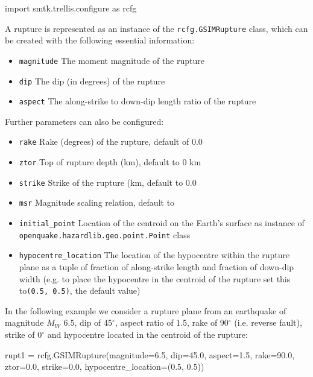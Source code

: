 \begin{python}
import smtk.trellis.configure as rcfg
\end{python}

A rupture is represented as an instance of the \verb=rcfg.GSIMRupture= class, which can be created with the following essential information:

\begin{itemize}
\item \verb=magnitude= The moment magnitude of the rupture
\item \verb=dip= The dip (in degrees) of the rupture
\item \verb=aspect= The along-strike to down-dip length ratio of the rupture
\end{itemize}

Further parameters can also be configured:
\begin{itemize}
\item \verb=rake= Rake (degrees) of the rupture, default of 0.0
\item \verb=ztor= Top of rupture depth (km), default to 0 km
\item \verb=strike= Strike of the rupture (km, default to 0.0
\item \verb=msr= Magnitude scaling relation, default to \cite{WellsCoppersmith1994}
\item \verb=initial_point= Location of the centroid on the Earth's surface as instance of \\ \verb=openquake.hazardlib.geo.point.Point= class
\item \verb=hypocentre_location= The location of the hypocentre within the rupture plane as a tuple of fraction of along-strike length and fraction of down-dip width (e.g. to place the hypocentre in the centroid of the rupture set this to\verb=(0.5, 0.5)=, the default value)
\end{itemize}

In the following example we consider a rupture plane from an earthquake of magnitude $M_W$ 6.5, dip of 45$^{\circ}$, aspect ratio of 1.5, rake of 90$^{\circ}$ (i.e. reverse fault), strike of 0$^{\circ}$ and hypocentre located in the centroid of the rupture:

\begin{python}[frame=single]
rupt1 = rcfg.GSIMRupture(magnitude=6.5,
                         dip=45.0,
                         aspect=1.5,
                         rake=90.0, 
                         ztor=0.0,
                         strike=0.0,
                         hypocentre_location=(0.5, 0.5))
\end{python}

